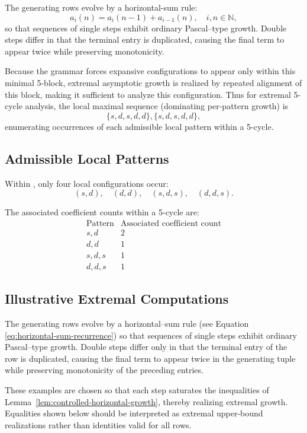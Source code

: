 \documentclass[12pt, oneside]{article}   	%
\numberwithin{equation}{section}          %
\theoremstyle{definition}
\begin{document}
The generating rows evolve by a horizontal-sum rule:
\begin{equation}
a_i(n) = a_i(n-1) + a_{i-1}(n), \quad i,n \in \mathbb{N},
\label{eq:horizontal-sum-recurrence}
\end{equation}
so that sequences of single steps exhibit ordinary Pascal--type growth.
Double steps differ in that the terminal entry is duplicated, causing the
final term to appear twice while preserving monotonicity.

Because the grammar forces expansive configurations to appear only within this minimal 5-block,
extremal asymptotic growth is realized by repeated alignment of this block, making it sufficient
to analyze this configuration.  Thus for extremal 5-cycle analysis, the local maximal sequence
(dominating per-pattern growth) is
\[
\{ s, d, s, d, d \}, \{ s, d, s, d, d \},
\]
enumerating occurrences of each admissible local pattern within a 5-cycle.

\subsection*{Admissible Local Patterns}
\label{sec:admissible-patterns}

Within , only four local configurations occur:
\[
(s, d), \quad (d, d), \quad (s, d, s), \quad (d, d, s).
\]

The associated coefficient counts within a 5-cycle are:
\[
\begin{array}{c|c}
\text{Pattern} & \text{Associated coefficient count} \\
\hline
s,d & 2 \\
d,d & 1 \\
s,d,s & 1 \\
d,d,s & 1
\end{array}
\]

\subsection{Illustrative Extremal Computations}

The generating rows evolve by a horizontal--sum rule (see Equation \ref{eq:horizontal-sum-recurrence})
so that sequences of single steps exhibit ordinary Pascal--type growth.
Double steps differ only in that the terminal entry of the row is duplicated,
causing the final term to appear twice in the generating tuple while preserving
monotonicity of the preceding entries.

These examples are chosen so that each step saturates the inequalities of
Lemma~\ref{lem:controlled-horizontal-growth}, thereby realizing extremal growth. Equalities
shown below should be interpreted as extremal upper-bound realizations rather than
identities valid for all rows.
\end{document}
